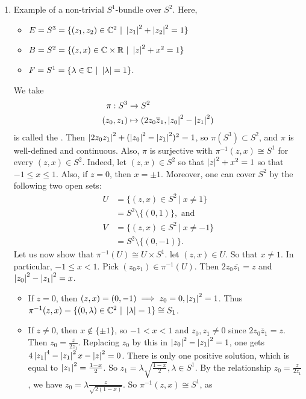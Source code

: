 \documentclass[main.tex]{subfiles}
\begin{document}
\begin{exmp}
\begin{enumerate}
    \item {} Example of a non-trivial $S^1$-bundle over $S^2$. Here,
    \begin{itemize}
        \item $E = S^3 = \{(z_1, z_2) \in \C^2 \ | \ \anorm{z_1}^2 + \anorm{z_2}^2= 1 \}$
        \item $B = S^2 = \{(z, x) \in \C \times \R \ | \ \anorm{z}^2 + x^2 = 1 \}$
        \item $F = S^1 = \{ \lambda \in \C \ | \ \anorm{\lambda} = 1 \}$.
    \end{itemize}
    We take
    \begin{align*}
        \pi : S^3 &\to S^2 \\
        (z_0, z_1) &\mapsto (2z_0\overline{z}_1, \left| z_0 \right|^2 - \left| z_1 \right|^2)
    \end{align*}
    is called the . Then $\left| 2z_0z_1 \right|^2 + (\left| z_0 \right|^2 - \left| z_1 \right|^2)^2 = 1$, so $\pi(S^3) \subset S^2$, and $\pi$ is well-defined and continuous. Also, $\pi$ is surjective with $\pi^{-1}(z, x) \cong S^1$ for every $(z, x) \in S^2$. Indeed, let $(z, x) \in S^2$ so that $\left| z \right|^2 + x^2 = 1$ so that $-1 \leq x \leq 1$. Also, if $z = 0$, then $x = \pm 1$. Moreover, one can cover $S^2$ by the following two open sets: 
    \begin{align*}
        U &= \{ (z, x) \in S^2 \ | \ x \neq 1 \} \\
          &= S^2 \setminus \{(0, 1)\}, \text{ and } \\
        V &= \{ (z, x) \in S^2 \ | \ x \neq -1\} \\
          &= S^2 \setminus \{(0, -1)\}.
    \end{align*}
    Let us now show that $\pi^{-1}(U) \cong U \times S^1$. let $(z, x) \in U$. So that $x \neq 1$. In particular, $-1 \leq x < 1$. Pick $(z_0 z_1) \in \pi^{-1}(U)$. Then $2z_0\overline{z_1} = z$ and $\left| z_0 \right|^2 - \left| z_1 \right|^2 =x$.
    \begin{itemize}
        \item If $z = 0$, then $(z,x) = (0, -1) \implies z_0 = 0, \left| z_1 \right|^2 = 1$. Thus $\pi^{-1}(z,x) = \{ (0, \lambda) \in \mathbb{C}^2 \ | \ \left| \lambda \right| = 1  \} \cong S_1$.
        \item If $z \neq 0$, then $x \notin \{ \pm1\}$, so $-1 < x < 1$ and $z_0, z_1 \neq 0$ since $2z_0 \overline{z}_1 = z$. Then $z_0 = \frac{z}{2\overline{z}_1}$. Replacing $z_0$ by this in $\left| z_0 \right|^2 - \left| z_1 \right|^2 = 1$, one gets $4\left| z_1 \right|^4 - \left| z_1 \right|^2x - \left| z \right|^2 = 0$. There is only one positive solution, which is equal to $\left| z_1 \right|^2 = \frac{1-x}{2}$. So $z_1 = \lambda \sqrt{\frac{1-x}{2}}, \lambda \in S^1$.  By the relationship $z_0 = \frac{z}{2\overline{z_1}}$, we have $z_0 = \lambda \frac{z}{\sqrt{2(1-x)}}$. So $\pi^{-1}(z,x) \cong S^1$, as

\end{itemize}
\end{enumerate}
\end{exmp}
\end{document}
